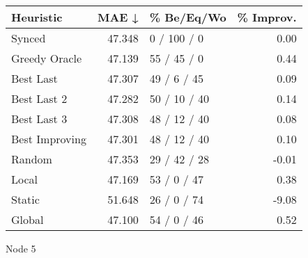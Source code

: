 \begin{tabular}{lrlr}
\toprule
\textbf{Heuristic} & \textbf{MAE ↓} & \textbf{\% Be/Eq/Wo} & \textbf{\% Improv.} \\
\midrule
            Synced &         47.348 &          0 / 100 / 0 &                0.00 \\
     Greedy Oracle &         47.139 &          55 / 45 / 0 &                0.44 \\
         Best Last &         47.307 &          49 / 6 / 45 &                0.09 \\
       Best Last 2 &         47.282 &         50 / 10 / 40 &                0.14 \\
       Best Last 3 &         47.308 &         48 / 12 / 40 &                0.08 \\
    Best Improving &         47.301 &         48 / 12 / 40 &                0.10 \\
            Random &         47.353 &         29 / 42 / 28 &               -0.01 \\
             Local &         47.169 &          53 / 0 / 47 &                0.38 \\
            Static &         51.648 &          26 / 0 / 74 &               -9.08 \\
            Global &         47.100 &          54 / 0 / 46 &                0.52 \\
\bottomrule
\end{tabular}
\caption{Node 5}
\label{tab:iid_lr01_le1_bs2_5}
